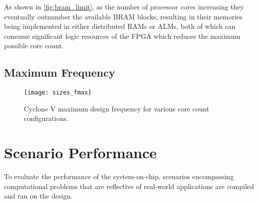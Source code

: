 As shown in \cref{fig:bram_limit}, as the number of processor cores increasing they eventually outnumber the available BRAM blocks, resulting in their memories being implemented in either distributed RAMs or ALMs, both of which can consume significant logic resources of the FPGA which reduces the maximum possible core count.

\subsection{Maximum Frequency}
\begin{figure}[h]
\centering
\texttt{[image: sizes\_fmax]}
\caption{Cyclone V maximum design frequency for various core count configurations.}
\label{fig:sizes_fmax}
\end{figure}

\section{Scenario Performance}
To evaluate the performance of the system-on-chip, scenarios encompassing computational problems that are reflective of real-world applications are compiled and ran on the design.

